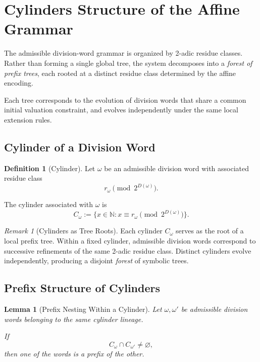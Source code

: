 \documentclass[12pt, oneside]{article}
\numberwithin{equation}{section}
\theoremstyle{definition}
\newtheorem{definition}{Definition}[section]
\theoremstyle{plain}
\newtheorem{lemma}[theorem]{Lemma}
\theoremstyle{remark}
\newtheorem*{remark}{Remark}
\begin{document}
\section{Cylinders Structure of the Affine Grammar}
\label{sec:cylinders-structure}

The admissible division-word grammar is organized by
2-adic residue classes. Rather than forming a single global tree,
the system decomposes into a \emph{forest of prefix trees}, each
rooted at a distinct residue class determined by the affine encoding.

Each tree corresponds to the evolution of division words that share
a common initial valuation constraint, and evolves independently
under the same local extension rules.

\subsection{Cylinder of a Division Word}
\begin{definition}[Cylinder]
Let $\omega$ be an admissible division word with associated residue
class
\[
r_\omega \pmod{2^{D(\omega)}}.
\]

The cylinder associated with $\omega$ is
\[
C_\omega
:=
\{x \in \mathbb N :
x \equiv r_\omega \pmod{2^{D(\omega)}}\}.
\]
\end{definition}

\begin{remark}[Cylinders as Tree Roots]
Each cylinder $C_\omega$ serves as the root of a local prefix tree.
Within a fixed cylinder, admissible division words correspond to
successive refinements of the same 2-adic residue class. Distinct
cylinders evolve independently, producing a disjoint \emph{forest}
of symbolic trees.
\end{remark}

\subsection{Prefix Structure of Cylinders}

\begin{lemma}[Prefix Nesting Within a Cylinder]
Let $\omega,\omega'$ be admissible division words belonging to the
same cylinder lineage.

If
\[
C_\omega \cap C_{\omega'} \neq \varnothing,
\]
then one of the words is a prefix of the other.
\end{lemma}
\end{document}
